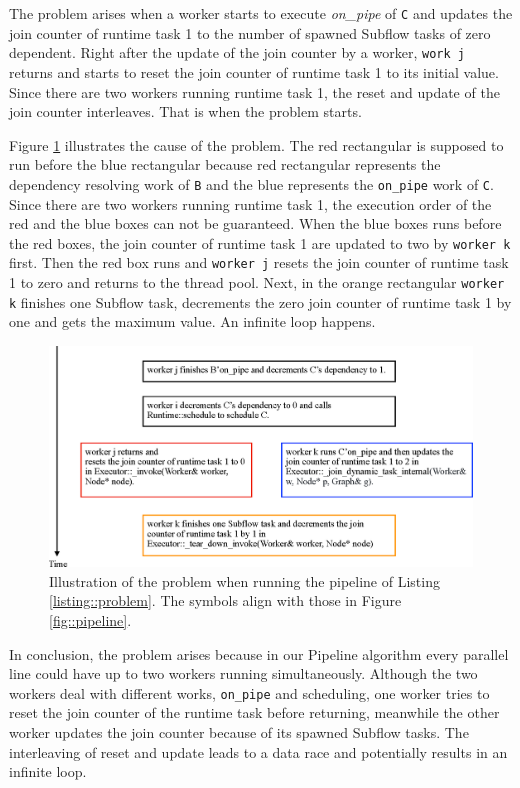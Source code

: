 \documentclass[11pt,twoside]{article}
\theoremstyle{plain}
\theoremstyle{definition}
\theoremstyle{remark}
\begin{document}
The problem arises when a worker starts to execute \textit{on\_pipe} of \texttt{C}
and updates the join counter of runtime task 1 to the number of spawned Subflow tasks
of zero dependent.
Right after the update of the join counter by a worker,
\texttt{work j} returns and starts to reset the join counter of runtime task 1 to its
initial value. 
Since there are two workers running runtime task 1, the reset and update
of the join counter interleaves.
That is when the problem starts. 

Figure \ref{fig::illustration} illustrates the cause of the problem.
The red rectangular is supposed to run before the blue rectangular because
red rectangular represents the dependency resolving work of \texttt{B}
and the blue represents the \texttt{on\_pipe} work of \texttt{C}.
Since there are two workers running runtime task 1,
the execution order of the red and the blue boxes
can not be guaranteed.
When the blue boxes runs before the red boxes,
the join counter of runtime task 1 
are updated to two by \texttt{worker k} first.
Then the red box runs and \texttt{worker j} resets
the join counter of runtime task 1 to zero and returns to the thread pool.
Next, in the orange rectangular \texttt{worker k} finishes
one Subflow task, decrements the zero join counter of runtime task 1 by one
and gets the maximum value. An infinite loop happens.
  


\begin{figure}[!h]
  \centering
  \centerline{\includegraphics[width=.9\columnwidth]{Figure/illustration.eps}}
  \caption{
    Illustration of the problem when running the pipeline of Listing \ref{listing::problem}.
    The symbols align with those in Figure \ref{fig::pipeline}.
  }
  \label{fig::illustration}
\end{figure}

In conclusion, the problem arises because in our Pipeline algorithm
every parallel line could have up to two workers running simultaneously.
Although the two workers deal with different works, \texttt{on\_pipe}
and scheduling,
one worker tries to reset the join counter of the runtime task before returning,
meanwhile the other worker updates the join counter because of its spawned
Subflow tasks.
The interleaving of reset and update leads to a data race and
potentially results in an infinite loop.
\end{document}
